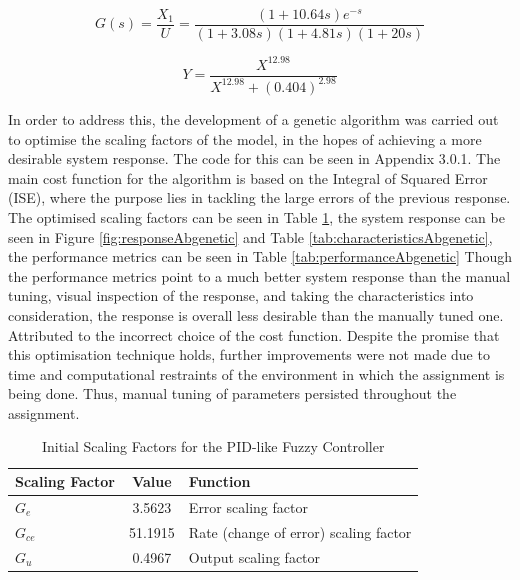 \documentclass[12pt]{article}
\begin{document}
\begin{equation}
    G(s) = \frac{X_1}{U} = \frac{(1 + 10.64s) e^{-s}}{(1 + 3.08s)(1 + 4.81s)(1 + 20s)} 
    \tag{A1}
\end{equation}

\begin{equation}
    Y = \frac{X^{12.98}}{X^{12.98} + (0.404)^{2.98}} 
    \tag{A2}
\end{equation}

In order to address this, the development of a genetic algorithm was carried out to optimise the scaling factors of the model, in the hopes of achieving a more desirable system response.
The code for this can be seen in Appendix 3.0.1.
The main cost function for the algorithm is based on the Integral of Squared Error (ISE), where the purpose lies in tackling the large errors of the previous response.
The optimised scaling factors can be seen in Table \ref{tab:scalingFactorAbgenetic}, the system response can be seen in Figure \ref{fig:responseAbgenetic} and Table \ref{tab:characteristicsAbgenetic}, the performance metrics can be seen in Table \ref{tab:performanceAbgenetic}
Though the performance metrics point to a much better system response than the manual tuning, visual inspection of the response, and taking the characteristics into consideration, the response is overall less desirable than the manually tuned one.
Attributed to the incorrect choice of the cost function.
Despite the promise that this optimisation technique holds, further improvements were not made due to time and computational restraints of the environment in which the assignment is being done. 
Thus, manual tuning of parameters persisted throughout the assignment.
\\

\begin{table}[H]
\centering
\begin{tabular}{|l|c|l|}
\hline
\textbf{Scaling Factor} & \textbf{Value} & \textbf{Function} \\ \hline
$G_e$ &  3.5623  & Error scaling factor \\ \hline
$G_{ce}$ &  51.1915  & Rate (change of error) scaling factor \\ \hline
$G_u$ & 0.4967 & Output scaling factor \\ \hline
\end{tabular}
\caption{Initial Scaling Factors for the PID-like Fuzzy Controller}
\label{tab:scalingFactorAbgenetic}
\end{table}
\end{document}
